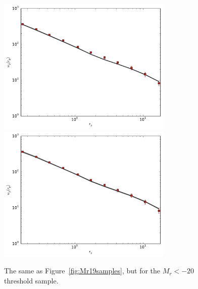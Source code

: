 \documentclass[usenatbib,usegraphicx,letterpaper]{mn2e}
\begin{document}
\begin{figure}
\begin{center}
\includegraphics[width=8.3cm]{Mr20samples.pdf}
\includegraphics[width=8.3cm]{Mr20ABsamples.pdf}
\caption{
The same as Figure~\ref{fig:Mr19samples}, but for the $M_r<-20$ threshold sample.
}
\label{fig:Mr20samples}
\end{center}
\end{figure}
\end{document}
